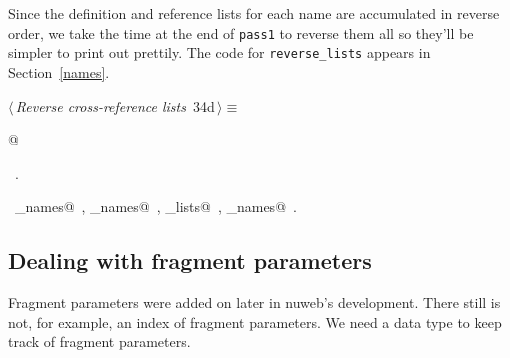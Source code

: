 \documentclass[a4paper]{report}
\begin{document}
Since the definition and reference lists for each name are accumulated
in reverse order, we take the time at the end of \verb|pass1| to
reverse them all so they'll be simpler to print out prettily.
The code for \verb|reverse_lists| appears in Section~\ref{names}.
\begin{flushleft} \small
\begin{minipage}{\linewidth}\label{scrap64}\raggedright\small
{} $\langle\,${\it Reverse cross-reference lists}\nobreak\ {\footnotesize {34d}}$\,\rangle\equiv$
\vspace{-1ex}
\begin{list}{}{} \item
\mbox{}@{\NWsep}
\end{list}
\vspace{-1.5ex}
\footnotesize
\begin{list}{}{\setlength{\itemsep}{-\parsep}\setlength{\itemindent}{-\leftmargin}}
\item \NWtxtMacroRefIn\ .
\item \NWtxtIdentsUsed\nobreak\  \verb@file_names@\nobreak\ , \verb@macro_names@\nobreak\ , \verb@reverse_lists@\nobreak\ , \verb@user_names@\nobreak\ .
\item{}
\end{list}
\end{minipage}\vspace{4ex}
\end{flushleft}
\subsection{Dealing with fragment parameters}

Fragment parameters were added on later in nuweb's development.
There still is not, for example, an index of fragment parameters.
We need a data type to keep track of fragment parameters.
\end{document}
